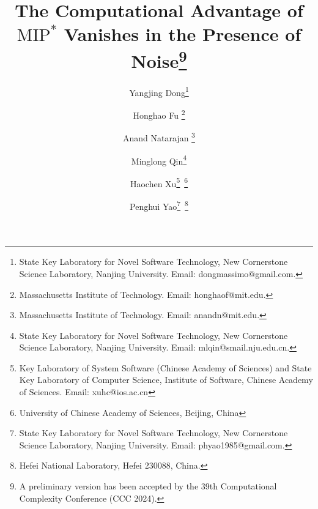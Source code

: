 \documentclass[11pt]{article}
\theoremstyle{plain}
\theoremstyle{definition}
\newcommand {\email} [1] {\href{mailto:#1}{\texttt{#1}}}
\newcommand {\authorblock} [3] {
	\begin{minipage}[t]{0.3\linewidth}
		\centering
		{#1}\\[0.8ex]
		{\footnotesize {#2}\\[-0.7ex]
		\email{#3}}
	\end{minipage}\vspace{1ex}
}
\newcommand{\1}{\mathbb{1}} %
\begin{document}
\title{The Computational Advantage of $\mathrm{MIP}^\ast$ Vanishes in the Presence of Noise\footnote{A preliminary  version has been accepted by the 39th Computational Complexity Conference (CCC 2024).}\\[2ex]}
\date{}

\ifx\AnonymousSwitch\undefined
\author{
    \and Yangjing Dong\thanks{\scriptsize State Key Laboratory for Novel Software Technology, New Cornerstone Science Laboratory, Nanjing University. Email: dongmassimo@gmail.com.}
    \and Honghao Fu \thanks{\scriptsize Massachusetts Institute of Technology. Email: honghaof@mit.edu.}
    \and Anand Natarajan \thanks{\scriptsize Massachusetts Institute of Technology. Email: anandn@mit.edu.}
    \and Minglong Qin\thanks{\scriptsize State Key Laboratory for Novel Software Technology, New Cornerstone Science Laboratory, Nanjing University. Email: mlqin@smail.nju.edu.cn.}
    \and Haochen Xu\thanks{\scriptsize Key Laboratory of System Software (Chinese Academy of Sciences) and State Key Laboratory of Computer Science, Institute of Software, Chinese Academy of Sciences. Email: xuhc@ios.ac.cn}~\thanks{\scriptsize University of Chinese Academy of Sciences, Beijing, China}
    \and Penghui Yao\thanks{\scriptsize State Key Laboratory for Novel Software Technology, New Cornerstone Science Laboratory, Nanjing University. Email: phyao1985@gmail.com.}~\thanks{\scriptsize Hefei National Laboratory, Hefei 230088, China.}
}
\fi



\clearpage\maketitle
\end{document}
